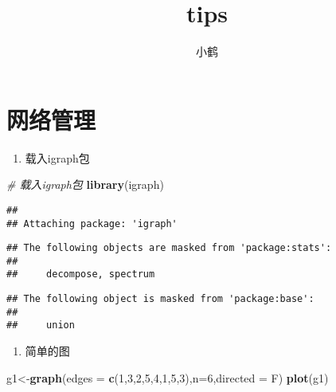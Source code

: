 \documentclass[hyperref,]{ctexart}
\title{tips}
\author{小鹤}
\date{}
\newenvironment{Shaded}{\begin{snugshade}}{\end{snugshade}}
\newcommand{\KeywordTok}[1]{\textcolor[rgb]{0.13,0.29,0.53}{\textbf{#1}}}
\newcommand{\DataTypeTok}[1]{\textcolor[rgb]{0.13,0.29,0.53}{#1}}
\newcommand{\DecValTok}[1]{\textcolor[rgb]{0.00,0.00,0.81}{#1}}
\newcommand{\CommentTok}[1]{\textcolor[rgb]{0.56,0.35,0.01}{\textit{#1}}}
\newcommand{\NormalTok}[1]{#1}
\providecommand{\tightlist}{%
  \setlength{\itemsep}{0pt}\setlength{\parskip}{0pt}}
\begin{document}
\maketitle

{
\setcounter{tocdepth}{2}
\tableofcontents
}
\section{网络管理}

\begin{enumerate}
\def\labelenumi{\arabic{enumi}.}
\tightlist
\item
  载入igraph包
\end{enumerate}

\begin{Shaded}
\begin{Highlighting}[]
\CommentTok{# 载入igraph包}
\KeywordTok{library}\NormalTok{(igraph)}
\end{Highlighting}
\end{Shaded}

\begin{verbatim}
## 
## Attaching package: 'igraph'
\end{verbatim}

\begin{verbatim}
## The following objects are masked from 'package:stats':
## 
##     decompose, spectrum
\end{verbatim}

\begin{verbatim}
## The following object is masked from 'package:base':
## 
##     union
\end{verbatim}

\begin{enumerate}
\def\labelenumi{\arabic{enumi}.}
\setcounter{enumi}{1}
\tightlist
\item
  简单的图
\end{enumerate}

\begin{Shaded}
\begin{Highlighting}[]
\NormalTok{g1<-}\KeywordTok{graph}\NormalTok{(}\DataTypeTok{edges =} \KeywordTok{c}\NormalTok{(}\DecValTok{1}\NormalTok{,}\DecValTok{3}\NormalTok{,}\DecValTok{2}\NormalTok{,}\DecValTok{5}\NormalTok{,}\DecValTok{4}\NormalTok{,}\DecValTok{1}\NormalTok{,}\DecValTok{5}\NormalTok{,}\DecValTok{3}\NormalTok{),}\DataTypeTok{n=}\DecValTok{6}\NormalTok{,}\DataTypeTok{directed =}\NormalTok{ F)}
\KeywordTok{plot}\NormalTok{(g1)}
\end{Highlighting}
\end{Shaded}
\end{document}
